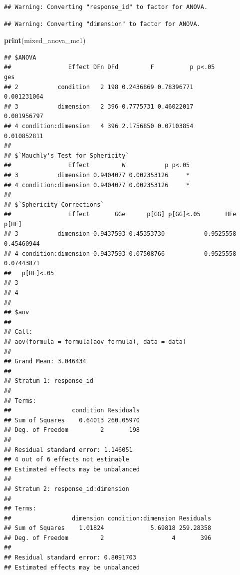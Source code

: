 \documentclass[
]{article}
\newenvironment{Shaded}{\begin{snugshade}}{\end{snugshade}}
\newcommand{\FunctionTok}[1]{\textcolor[rgb]{0.13,0.29,0.53}{\textbf{#1}}}
\newcommand{\NormalTok}[1]{#1}
\begin{document}
\begin{verbatim}
## Warning: Converting "response_id" to factor for ANOVA.
\end{verbatim}

\begin{verbatim}
## Warning: Converting "dimension" to factor for ANOVA.
\end{verbatim}

\begin{Shaded}
\begin{Highlighting}[]
\FunctionTok{print}\NormalTok{(mixed\_anova\_mc1)}
\end{Highlighting}
\end{Shaded}

\begin{verbatim}
## $ANOVA
##                Effect DFn DFd         F          p p<.05         ges
## 2           condition   2 198 0.2436869 0.78396771       0.001231064
## 3           dimension   2 396 0.7775731 0.46022017       0.001956797
## 4 condition:dimension   4 396 2.1756850 0.07103854       0.010852811
## 
## $`Mauchly's Test for Sphericity`
##                Effect         W           p p<.05
## 3           dimension 0.9404077 0.002353126     *
## 4 condition:dimension 0.9404077 0.002353126     *
## 
## $`Sphericity Corrections`
##                Effect       GGe      p[GG] p[GG]<.05       HFe      p[HF]
## 3           dimension 0.9437593 0.45353730           0.9525558 0.45460944
## 4 condition:dimension 0.9437593 0.07508766           0.9525558 0.07443871
##   p[HF]<.05
## 3          
## 4          
## 
## $aov
## 
## Call:
## aov(formula = formula(aov_formula), data = data)
## 
## Grand Mean: 3.046434
## 
## Stratum 1: response_id
## 
## Terms:
##                 condition Residuals
## Sum of Squares    0.64013 260.05970
## Deg. of Freedom         2       198
## 
## Residual standard error: 1.146051
## 4 out of 6 effects not estimable
## Estimated effects may be unbalanced
## 
## Stratum 2: response_id:dimension
## 
## Terms:
##                 dimension condition:dimension Residuals
## Sum of Squares    1.01824             5.69818 259.28358
## Deg. of Freedom         2                   4       396
## 
## Residual standard error: 0.8091703
## Estimated effects may be unbalanced
\end{verbatim}
\end{document}
